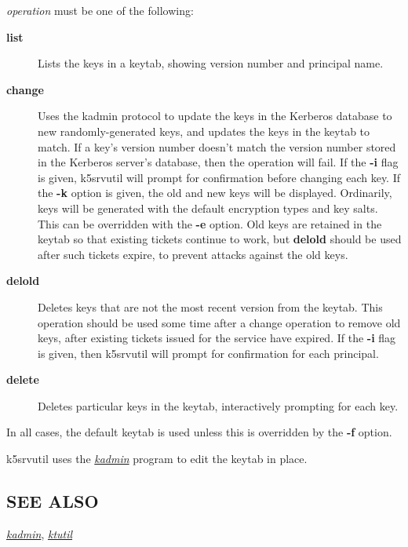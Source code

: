\documentclass[letterpaper,10pt,english]{sphinxmanual}
\begin{document}
\emph{operation} must be one of the following:
\begin{description}
\item[{\textbf{list}}] \leavevmode
Lists the keys in a keytab, showing version number and principal
name.

\item[{\textbf{change}}] \leavevmode
Uses the kadmin protocol to update the keys in the Kerberos
database to new randomly-generated keys, and updates the keys in
the keytab to match.  If a key's version number doesn't match the
version number stored in the Kerberos server's database, then the
operation will fail.  If the \textbf{-i} flag is given, k5srvutil will
prompt for confirmation before changing each key.  If the \textbf{-k}
option is given, the old and new keys will be displayed.
Ordinarily, keys will be generated with the default encryption
types and key salts.  This can be overridden with the \textbf{-e}
option.  Old keys are retained in the keytab so that existing
tickets continue to work, but \textbf{delold} should be used after
such tickets expire, to prevent attacks against the old keys.

\item[{\textbf{delold}}] \leavevmode
Deletes keys that are not the most recent version from the keytab.
This operation should be used some time after a change operation
to remove old keys, after existing tickets issued for the service
have expired.  If the \textbf{-i} flag is given, then k5srvutil will
prompt for confirmation for each principal.

\item[{\textbf{delete}}] \leavevmode
Deletes particular keys in the keytab, interactively prompting for
each key.

\end{description}

In all cases, the default keytab is used unless this is overridden by
the \textbf{-f} option.

k5srvutil uses the {\hyperref[admin/admin_commands/kadmin_local:kadmin-1]{\emph{kadmin}}} program to edit the keytab in
place.


\subsection{SEE ALSO}
\label{admin/admin_commands/k5srvutil:see-also}
{\hyperref[admin/admin_commands/kadmin_local:kadmin-1]{\emph{kadmin}}}, {\hyperref[admin/admin_commands/ktutil:ktutil-1]{\emph{ktutil}}}
\end{document}

